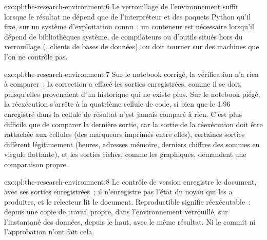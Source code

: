 \begin{solution}{exo:pl:the-research-environment:6}
Le verrouillage de l'environnement suffit lorsque le résultat ne dépend que de l'interpréteur et des paquets Python qu'il fixe, sur un système d'exploitation connu~; un conteneur est
nécessaire lorsqu'il dépend de bibliothèques système, de compilateurs ou d'outils situés hors du verrouillage (, clients de bases de données), ou doit tourner sur des machines
que l'on ne contrôle pas.
\end{solution}

\begin{solution}{exo:pl:the-research-environment:7}
Sur le notebook corrigé, la vérification n'a rien à comparer~: la correction a effacé les sorties enregistrées, comme il se doit, puisqu'elles provenaient d'un historique qui ne
existe plus. Sur le notebook piégé, la réexécution s'arrête à la quatrième cellule de code, si bien que le 1.96 enregistré dans la cellule de résultat n'est jamais comparé à rien.
C'est plus difficile que de comparer la dernière sortie, car la sortie de la réexécution doit être rattachée aux cellules (des marqueurs imprimés entre elles), certaines sorties
diffèrent légitimement (heures, adresses mémoire, derniers chiffres des sommes en virgule flottante), et les sorties riches, comme les graphiques, demandent une comparaison propre.
\end{solution}

\begin{solution}{exo:pl:the-research-environment:8}
Le contrôle de version enregistre le document, avec ses sorties enregistrées~; il n'enregistre pas l'état du noyau qui les a produites, et le relecteur lit le
document. Reproductible signifie réexécutable~: depuis une copie de travail propre, dans l'environnement verrouillé, sur l'instantané des données, depuis le haut, avec le même
résultat. Ni le commit ni l'approbation n'ont fait cela.
\end{solution}

